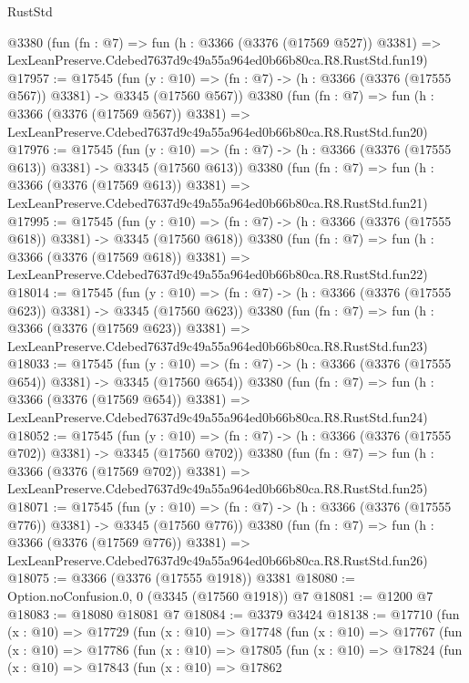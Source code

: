 \begin{lexlean}{RustStd}
\begin{coremodule}
    @3380
    (fun (fn : @7) =>
    fun (h : @3366 (@3376 (@17569 @527)) @3381) =>
    LexLeanPreserve.Cdebed7637d9c49a55a964ed0b66b80ca.R8.RustStd.fun19)
@17957 := @17545
    (fun (y : @10) => (fn : @7) -> (h : @3366 (@3376 (@17555 @567)) @3381) -> @3345 (@17560 @567))
    @3380
    (fun (fn : @7) =>
    fun (h : @3366 (@3376 (@17569 @567)) @3381) =>
    LexLeanPreserve.Cdebed7637d9c49a55a964ed0b66b80ca.R8.RustStd.fun20)
@17976 := @17545
    (fun (y : @10) => (fn : @7) -> (h : @3366 (@3376 (@17555 @613)) @3381) -> @3345 (@17560 @613))
    @3380
    (fun (fn : @7) =>
    fun (h : @3366 (@3376 (@17569 @613)) @3381) =>
    LexLeanPreserve.Cdebed7637d9c49a55a964ed0b66b80ca.R8.RustStd.fun21)
@17995 := @17545
    (fun (y : @10) => (fn : @7) -> (h : @3366 (@3376 (@17555 @618)) @3381) -> @3345 (@17560 @618))
    @3380
    (fun (fn : @7) =>
    fun (h : @3366 (@3376 (@17569 @618)) @3381) =>
    LexLeanPreserve.Cdebed7637d9c49a55a964ed0b66b80ca.R8.RustStd.fun22)
@18014 := @17545
    (fun (y : @10) => (fn : @7) -> (h : @3366 (@3376 (@17555 @623)) @3381) -> @3345 (@17560 @623))
    @3380
    (fun (fn : @7) =>
    fun (h : @3366 (@3376 (@17569 @623)) @3381) =>
    LexLeanPreserve.Cdebed7637d9c49a55a964ed0b66b80ca.R8.RustStd.fun23)
@18033 := @17545
    (fun (y : @10) => (fn : @7) -> (h : @3366 (@3376 (@17555 @654)) @3381) -> @3345 (@17560 @654))
    @3380
    (fun (fn : @7) =>
    fun (h : @3366 (@3376 (@17569 @654)) @3381) =>
    LexLeanPreserve.Cdebed7637d9c49a55a964ed0b66b80ca.R8.RustStd.fun24)
@18052 := @17545
    (fun (y : @10) => (fn : @7) -> (h : @3366 (@3376 (@17555 @702)) @3381) -> @3345 (@17560 @702))
    @3380
    (fun (fn : @7) =>
    fun (h : @3366 (@3376 (@17569 @702)) @3381) =>
    LexLeanPreserve.Cdebed7637d9c49a55a964ed0b66b80ca.R8.RustStd.fun25)
@18071 := @17545
    (fun (y : @10) => (fn : @7) -> (h : @3366 (@3376 (@17555 @776)) @3381) -> @3345 (@17560 @776))
    @3380
    (fun (fn : @7) =>
    fun (h : @3366 (@3376 (@17569 @776)) @3381) =>
    LexLeanPreserve.Cdebed7637d9c49a55a964ed0b66b80ca.R8.RustStd.fun26)
@18075 := @3366 (@3376 (@17555 @1918)) @3381
@18080 := Option.noConfusion.{0, 0} (@3345 (@17560 @1918)) @7
@18081 := @1200 @7
@18083 := @18080 @18081 @7
@18084 := @3379 @3424
@18138 := @17710
    (fun (x : @10) =>
    @17729
      (fun (x : @10) =>
      @17748
        (fun (x : @10) =>
        @17767
          (fun (x : @10) =>
          @17786
            (fun (x : @10) =>
            @17805
              (fun (x : @10) =>
              @17824
                (fun (x : @10) =>
                @17843
                  (fun (x : @10) =>
                  @17862

\end{coremodule}
\end{lexlean}
